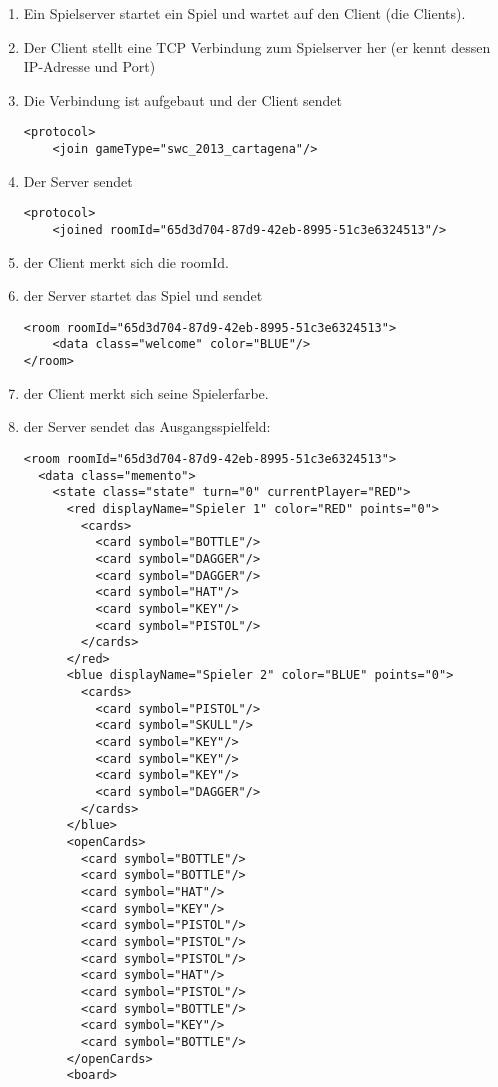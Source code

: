 \documentclass[12pt,a4paper, ngerman, oneside]{scrartcl}
\begin{document}
\begin{enumerate}
\item Ein Spielserver startet ein Spiel und wartet auf den Client (die Clients).
\item Der Client stellt eine TCP Verbindung zum Spielserver her (er kennt dessen IP-Adresse und Port)
\item Die Verbindung ist aufgebaut und der Client sendet \begin{verbatim}
<protocol>
    <join gameType="swc_2013_cartagena"/>
\end{verbatim}
\item Der Server sendet \begin{verbatim}
<protocol>
    <joined roomId="65d3d704-87d9-42eb-8995-51c3e6324513"/>
\end{verbatim}
\item der Client merkt sich die roomId.
\item der Server startet das Spiel und sendet \begin{verbatim}
<room roomId="65d3d704-87d9-42eb-8995-51c3e6324513">
    <data class="welcome" color="BLUE"/>
</room>
\end{verbatim}
\item der Client merkt sich seine Spielerfarbe.
\item der Server sendet das Ausgangsspielfeld: 
\begin{verbatim}
<room roomId="65d3d704-87d9-42eb-8995-51c3e6324513">
  <data class="memento">
    <state class="state" turn="0" currentPlayer="RED">
      <red displayName="Spieler 1" color="RED" points="0">
        <cards>
          <card symbol="BOTTLE"/>
          <card symbol="DAGGER"/>
          <card symbol="DAGGER"/>
          <card symbol="HAT"/>
          <card symbol="KEY"/>
          <card symbol="PISTOL"/>
        </cards>
      </red>
      <blue displayName="Spieler 2" color="BLUE" points="0">
        <cards>
          <card symbol="PISTOL"/>
          <card symbol="SKULL"/>
          <card symbol="KEY"/>
          <card symbol="KEY"/>
          <card symbol="KEY"/>
          <card symbol="DAGGER"/>
        </cards>
      </blue>
      <openCards>
        <card symbol="BOTTLE"/>
        <card symbol="BOTTLE"/>
        <card symbol="HAT"/>
        <card symbol="KEY"/>
        <card symbol="PISTOL"/>
        <card symbol="PISTOL"/>
        <card symbol="PISTOL"/>
        <card symbol="HAT"/>
        <card symbol="PISTOL"/>
        <card symbol="BOTTLE"/>
        <card symbol="KEY"/>
        <card symbol="BOTTLE"/>
      </openCards>
      <board>

\end{verbatim}
\end{enumerate}
\end{document}
